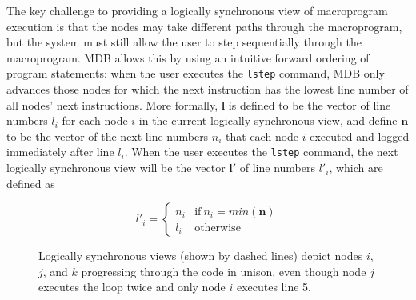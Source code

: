The key challenge to providing a logically synchronous view of macroprogram
execution is that the nodes may take different paths through the macroprogram,
but the system must still allow the user to step sequentially through the
macroprogram. MDB allows this by using an intuitive forward ordering of program
statements: when the user executes the {\tt lstep} command, MDB only advances
those nodes for which the next instruction has the lowest line number of all
nodes' next instructions.  More formally, $\mathbf{l}$ is defined to be the
vector of line numbers $l_i$ for each node $i$ in the current logically
synchronous view, and define $\mathbf{n}$ to be the vector of the next line
numbers $n_i$ that each node $i$ executed and logged immediately after line
$l_i$.  When the user executes the {\tt lstep} command, the next logically
synchronous view will be the vector $\mathbf{l'}$ of line numbers $l'_i$, which
are defined as

$$ l'_i =
\begin{cases}
  n_i & \mathrm{if~} n_i = min(\mathbf{n})\\
  l_i & \mathrm{otherwise}
\end{cases}
$$

\begin{figure}[t]
\caption[Logically synchronous views]{Logically synchronous views (shown by dashed lines) depict nodes $i$,
  $j$, and $k$ progressing through the code in unison, even though node $j$
  executes the loop twice and only node $i$ executes line 5.}
\label{fig:allBreakpoints}
\end{figure}

